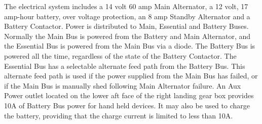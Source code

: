The electrical system includes a 14 volt 60 amp Main Alternator, a 12 volt, 17 amp-hour battery, over voltage protection, an 8 amp Standby Alternator and a Battery Contactor. Power is distributed to Main, Essential and Battery Buses. Normally the Main Bus is powered from the Battery and Main Alternator, and the Essential Bus is powered from the Main Bus via a diode. The Battery Bus is powered all the time, regardless of the state of the Battery Contactor. The Essential Bus has a selectable alternate feed path from the Battery Bus. This alternate feed path is used if the power supplied from the Main Bus has failed, or if the Main Bus is manually shed following Main Alternator failure. An Aux Power outlet located on the lower aft face of the right landing gear box provides 10A of Battery Bus power for hand held devices. It may also be used to charge the battery, providing that the charge current is limited to less than 10A.

